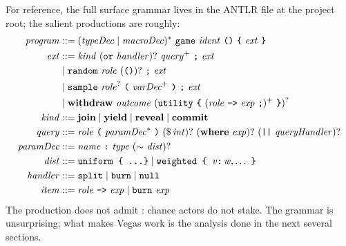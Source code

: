 For reference, the full surface grammar lives in the ANTLR file
 at the project root; the salient productions are
roughly:
\begin{align*}
\mathit{program} &::= (\mathit{typeDec} \mid \mathit{macroDec})^*\ \TT{game}\ \mathit{ident}\ \TT{()}\ \TT{\{}\ \mathit{ext}\ \TT{\}}\\
\mathit{ext} &::= \mathit{kind}\ (\texttt{or}\ \mathit{handler})?\ \mathit{query}^+\ \TT{;}\ \mathit{ext}\\
             &\mid \TT{random}\ \mathit{role}\ (\TT{()})?\ \TT{;}\ \mathit{ext}\\
             &\mid \TT{sample}\ \mathit{role}^?\ \TT{(}\ \mathit{varDec}^+\ \TT{)}\ \TT{;}\ \mathit{ext}\\
             &\mid \kwithdraw\ \mathit{outcome}\ (\TT{utility}\ \TT{\{}\ (\mathit{role}\ \TT{->}\ \mathit{exp}\ \TT{;})^+\ \TT{\}})^?\\
\mathit{kind} &::= \kjoin \mid \kyield \mid \kreveal \mid \kcommit\\
\mathit{query} &::= \mathit{role}\ \TT{(}\ \mathit{paramDec}^*\ \TT{)}\ (\$\,\mathit{int})?\ (\kwhere\ \mathit{exp})?\ (\TT{||}\ \mathit{queryHandler})?\\
\mathit{paramDec} &::= \mathit{name}\ \TT{:}\ \mathit{type}\ (\TT{$\sim$}\ \mathit{dist})?\\
\mathit{dist} &::= \TT{uniform \{ \dots \}} \mid \TT{weighted \{ }\mathit{v}\TT{:}\,\mathit{w},\dots\ \TT{\}}\\
\mathit{handler} &::= \TT{split} \mid \TT{burn} \mid \TT{null}\\
\mathit{item} &::= \mathit{role}\ \TT{->}\ \mathit{exp} \mid \TT{burn}\ \mathit{exp}
\end{align*}
The  production does not admit : chance
actors do not stake.  The grammar is unsurprising; what makes
Vegas work is the analysis done in the next several sections.
